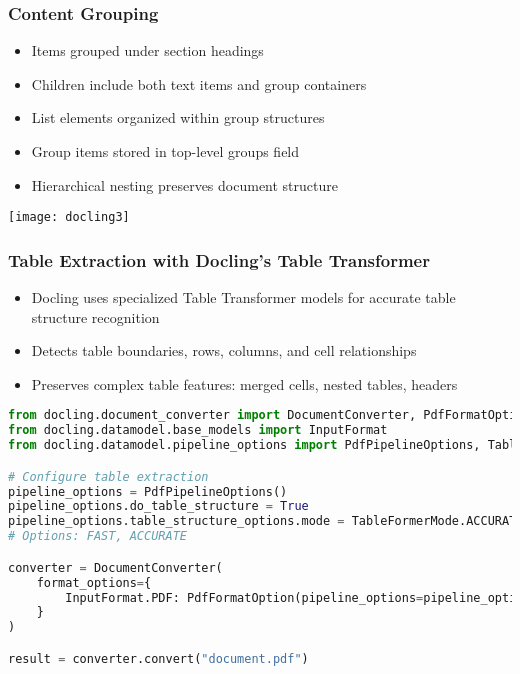 \begin{frame}[fragile]\frametitle{Content Grouping}

      \begin{itemize}
		\item Items grouped under section headings
		\item Children include both text items and group containers
		\item List elements organized within group structures
		\item Group items stored in top-level groups field
		\item Hierarchical nesting preserves document structure
	  \end{itemize}

		\begin{center}
		\texttt{[image: docling3]}
		\end{center}	

\end{frame}

\begin{frame}[fragile]\frametitle{Table Extraction with Docling's Table Transformer}
      \begin{itemize}
          \item Docling uses specialized Table Transformer models for accurate table structure recognition
          \item Detects table boundaries, rows, columns, and cell relationships
          \item Preserves complex table features: merged cells, nested tables, headers
      \end{itemize}
      
\begin{lstlisting}[language=Python, basicstyle=\tiny, basicstyle=\tiny]
from docling.document_converter import DocumentConverter, PdfFormatOption
from docling.datamodel.base_models import InputFormat
from docling.datamodel.pipeline_options import PdfPipelineOptions, TableFormerMode

# Configure table extraction
pipeline_options = PdfPipelineOptions()
pipeline_options.do_table_structure = True
pipeline_options.table_structure_options.mode = TableFormerMode.ACCURATE
# Options: FAST, ACCURATE

converter = DocumentConverter(
    format_options={
        InputFormat.PDF: PdfFormatOption(pipeline_options=pipeline_options)
    }
)

result = converter.convert("document.pdf")
\end{lstlisting}
\end{frame}

